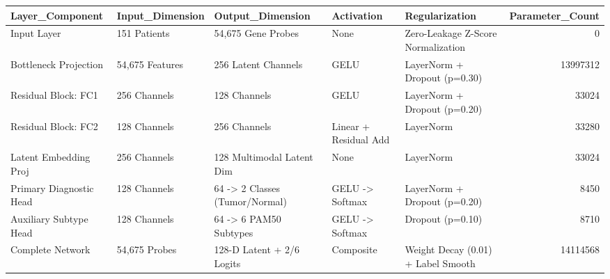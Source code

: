 \begin{tabular}{lllllr}
\toprule
Layer_Component & Input_Dimension & Output_Dimension & Activation & Regularization & Parameter_Count \\
\midrule
Input Layer & 151 Patients & 54,675 Gene Probes & None & Zero-Leakage Z-Score Normalization & 0 \\
Bottleneck Projection & 54,675 Features & 256 Latent Channels & GELU & LayerNorm + Dropout (p=0.30) & 13997312 \\
Residual Block: FC1 & 256 Channels & 128 Channels & GELU & LayerNorm + Dropout (p=0.20) & 33024 \\
Residual Block: FC2 & 128 Channels & 256 Channels & Linear + Residual Add & LayerNorm & 33280 \\
Latent Embedding Proj & 256 Channels & 128 Multimodal Latent Dim & None & LayerNorm & 33024 \\
Primary Diagnostic Head & 128 Channels & 64 -> 2 Classes (Tumor/Normal) & GELU -> Softmax & LayerNorm + Dropout (p=0.20) & 8450 \\
Auxiliary Subtype Head & 128 Channels & 64 -> 6 PAM50 Subtypes & GELU -> Softmax & Dropout (p=0.10) & 8710 \\
Complete Network & 54,675 Probes & 128-D Latent + 2/6 Logits & Composite & Weight Decay (0.01) + Label Smooth & 14114568 \\
\bottomrule
\end{tabular}
